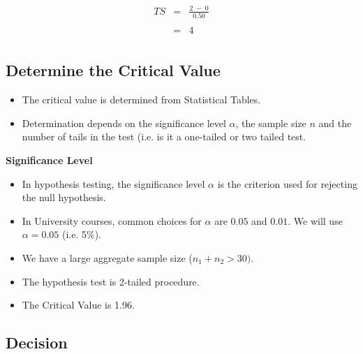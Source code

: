\documentclass[a4paper,12pt]{article}
\begin{document}
\begin{eqnarray*}
TS &=& \frac{ 2\;-\; 0}{0.50} \\
& & \\
&=& 4\\
\end{eqnarray*}
\newpage 
\subsection*{Determine the Critical Value}

\begin{itemize}
\item The critical value is determined from Statistical Tables.
\item Determination depends on the significance level $\alpha$, the sample size $n$ and the number of tails in the test (i.e. is it a one-tailed or two tailed test.
\end{itemize}

\noindent \textbf{Significance Level}

\begin{itemize}
\item In hypothesis testing, the significance level $\alpha$ is the criterion used for rejecting the null hypothesis. 

\item In University courses, common choices for $\alpha$ are $0.05$ and $0.01$. We will use $\alpha =0.05$ (i.e. 5\%).
\item We have a large aggregate sample size ($n_1 + n_2 > 30)$.
\item The hypothesis test is 2-tailed procedure.
\item The Critical Value is 1.96.
\end{itemize}


\newpage 
\subsection*{Decision}
\end{document}
